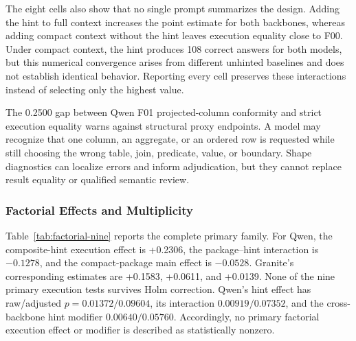 \documentclass[information,article,submit,moreauthors]{Definitions/mdpi}
\begin{document}
The eight cells also show that no single prompt summarizes the design. Adding the hint to full context increases the point estimate for both backbones, whereas adding compact context without the hint leaves execution equality close to F00. Under compact context, the hint produces 108 correct answers for both models, but this numerical convergence arises from different unhinted baselines and does not establish identical behavior. Reporting every cell preserves these interactions instead of selecting only the highest value.

The 0.2500 gap between Qwen F01 projected-column conformity and strict execution equality warns against structural proxy endpoints. A model may recognize that one column, an aggregate, or an ordered row is requested while still choosing the wrong table, join, predicate, value, or boundary. Shape diagnostics can localize errors and inform adjudication, but they cannot replace result equality or qualified semantic review.

\subsubsection{Factorial Effects and Multiplicity}

Table~\ref{tab:factorial-nine} reports the complete primary family. For Qwen, the composite-hint execution effect is +0.2306, the package--hint interaction is $-0.1278$, and the compact-package main effect is $-0.0528$. Granite's corresponding estimates are +0.1583, +0.0611, and +0.0139. None of the nine primary execution tests survives Holm correction. Qwen's hint effect has raw/adjusted $p=0.01372/0.09604$, its interaction $0.00919/0.07352$, and the cross-backbone hint modifier $0.00640/0.05760$. Accordingly, no primary factorial execution effect or modifier is described as statistically nonzero.
\end{document}
